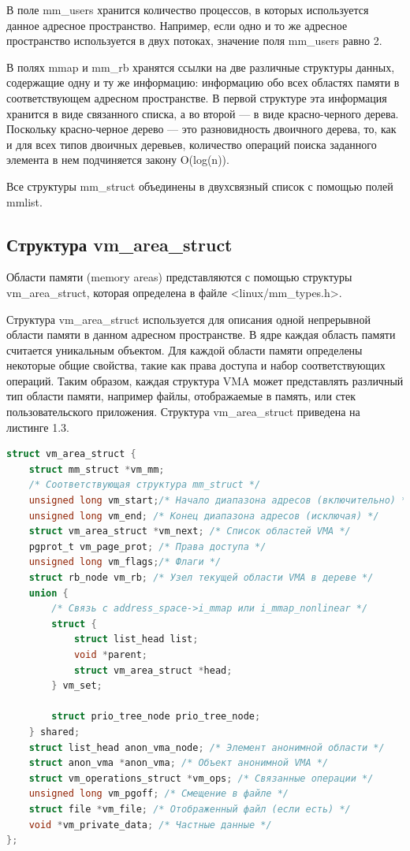 В поле mm\_users хранится количество процессов, в которых используется данное
адресное пространство. Например, если одно и то же адресное пространство 
используется в двух потоках, значение поля mm\_users равно 2.

В полях mmap и mm\_rb хранятся ссылки на две различные структуры данных, 
содержащие одну и ту же информацию: информацию обо всех областях памяти в 
соответствующем адресном пространстве. В первой структуре эта информация 
хранится в виде связанного списка, а во второй — в виде красно-черного дерева. 
Поскольку красно-черное дерево — это разновидность двоичного дерева, 
то, как и для всех типов двоичных деревьев,
количество операций поиска заданного элемента в нем подчиняется закону O(log(n)).

Все структуры mm\_struct объединены в двухсвязный список с помощью полей mmlist.

\subsection{Структура vm\_area\_struct}

Области памяти (memory areas) представляются с помощью структуры 
vm\_area\_struct, которая определена в файле <linux/mm\_types.h>.

Структура vm\_area\_struct используется для описания одной непрерывной 
области памяти в данном адресном пространстве. В ядре каждая область памяти считается
уникальным объектом. Для каждой области памяти определены некоторые общие 
свойства, такие как права доступа и набор соответствующих операций. Таким образом, 
каждая структура VMA может представлять различный тип области памяти, например 
файлы, отображаемые в память, или стек пользовательского приложения.
Структура vm\_area\_struct приведена на листинге 1.3.

\begin{lstlisting}[language=c, label=some-code, caption=Структура vm\_area\_struct]
struct vm_area_struct {
	struct mm_struct *vm_mm;
	/* Соответствующая структура mm_struct */
	unsigned long vm_start;/* Начало диапазона адресов (включительно) */
	unsigned long vm_end; /* Конец диапазона адресов (исключая) */
	struct vm_area_struct *vm_next; /* Список областей VMA */
	pgprot_t vm_page_prot; /* Права доступа */
	unsigned long vm_flags;/* Флаги */
	struct rb_node vm_rb; /* Узел текущей области VMA в дереве */
	union {
		/* Связь с address_space->i_mmap или i_mmap_nonlinear */
		struct {
			struct list_head list;
			void *parent;
			struct vm_area_struct *head;
		} vm_set;

		struct prio_tree_node prio_tree_node;
	} shared;
	struct list_head anon_vma_node; /* Элемент анонимной области */
	struct anon_vma *anon_vma; /* Объект анонимной VMA */
	struct vm_operations_struct *vm_ops; /* Связанные операции */
	unsigned long vm_pgoff; /* Смещение в файле */
	struct file *vm_file; /* Отображенный файл (если есть) */
	void *vm_private_data; /* Частные данные */
};
\end{lstlisting}

